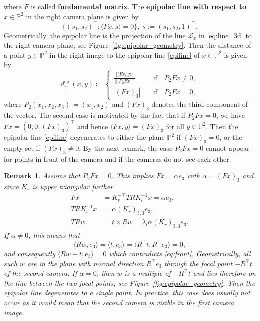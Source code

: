 \documentclass[10pt, twocolumn]{article}
\newtheorem{remark}[theorem]{Remark}
\theoremstyle{definition}
\begin{document}
where $F$ is called \textbf{fundamental matrix}.
The \textbf{epipolar line with respect to} $x \in \mathbb P^2$ in the right camera plane is given by
\begin{equation} \label{epiline}
\{(s_1,s_2)^\top: \langle Fx, s \rangle = 0 \}, \; s := (s_1,s_2,1)^\top.
\end{equation}
Geometrically, the epipolar line is the projection of the line  $\mathcal L_x$ in \eqref{eq:line_3d}
to the right camera plane, see Figure~\ref{fig:epipolar_geometry}.
Then the distance
of a point $y\in\mathbb P^2$ in the right image to the epipolar line \eqref{epiline}  of $x\in\mathbb P^2$ is given by
\begin{equation} \label{eq:di}
   d^\mathrm{epi}_r(x, y) 
   \coloneqq
   \begin{cases}\displaystyle
    \frac{|\langle F x,y\rangle|}{\|P_2{F x}\|} 
   &\quad \text{if} \quad
   P_2{F x}\neq 0,
   \\ 
      |(Fx)_3| &\quad \text{if} \quad
   P_2{F x}= 0,
   \end{cases}
\end{equation}
where $P_2{(x_1,x_2,x_3)}\coloneqq(x_1,x_2)$
and $(Fx)_3$ denotes the third component of the vector.
The second case is motivated by the fact that if $P_2Fx=0$, 
we have $Fx=(0,0,(Fx)_3)^\top$
and hence
$\langle Fx,y\rangle =(Fx)_3$ for all $y\in\mathbb P^2$. 
Then the epipolar line \eqref{epiline} degenerates to either the plane $\mathbb P^2$ if $(Fx)_3=0$,
or the empty set if $(Fx)_3\neq0$.
By the next remark, the case $P_2{F x}= 0$ cannot appear
for points in front of the camera and if the cameras do not see each other.

\begin{remark} \label{rem:special_case}
Assume that $P_2Fx=0$. This implies
$Fx=\alpha e_3$ with $\alpha=(Fx)_3$ and since $K_r$ is upper triangular further
\begin{align*}
F x &= K_r^{-\top} T R K_l^{-1} x = \alpha e_3,
\\
T R K_l^{-1} x &= \alpha (K_r)_{3,3} e_3,\\
T R w &= t \times R w = \lambda_l \alpha (K_r)_{3,3} e_3. 
\end{align*}
If $\alpha\neq0$, this means that
$$
\langle Rw,e_3\rangle 
=\langle t,e_3\rangle= \langle R^\top t, R^\top e_3 \rangle = 0,
$$
and consequently $\langle Rw+t,e_3\rangle=0$  which contradicts \eqref{eq:front}.
Geometrically, all such $w$ are in the plane  with normal direction $R^\top e_3$ 
through the focal point $-R^\top t$ of the second camera. 
If $\alpha=0$, then $w$ is a multiple of $-R^\top t$ 
and lies therefore on the line between the two focal points, see Figure~\ref{fig:epipolar_geometry}.
Then the epipolar line degenerates to a single point.
In practice, this case does usually not occur as it would mean that the second camera is visible in the first camera image. 
\end{remark}
\end{document}

